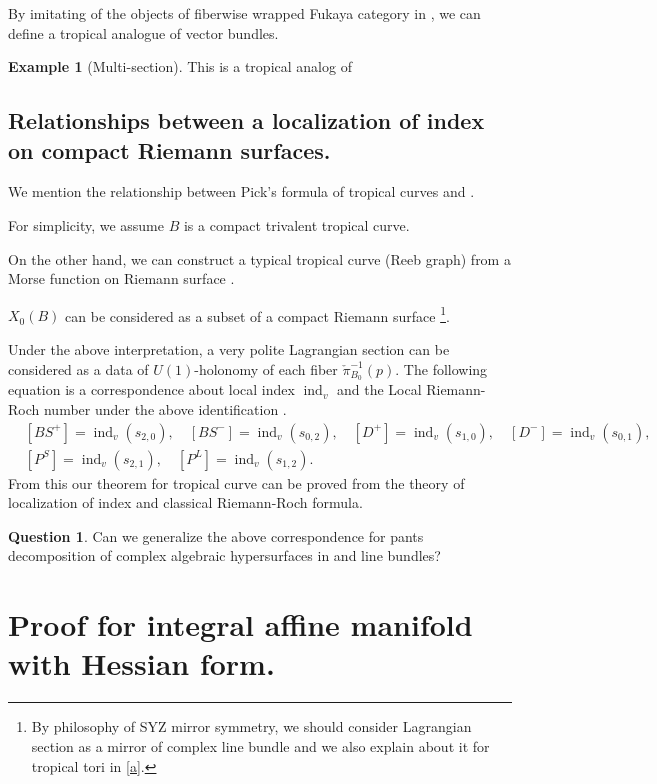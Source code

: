 \documentclass[a4paper,dvipdfmx,reqno,12pt]{amsart}
\theoremstyle{definition}
\newtheorem{Eg}[Thm]{Example}
\newtheorem{Ques}[Thm]{Question}
\newcommand{\opn}[1]{\operatorname{#1}}
\numberwithin{equation}{section}
\begin{document}
By imitating of the objects of fiberwise wrapped Fukaya category 
in \cite{auroux2022lagrangian}, we can define a tropical 
analogue of vector bundles.
\begin{Eg}[{Multi-section}]

This is a tropical analog of 
\end{Eg}

\subsection{Relationships between a localization of 
index on compact Riemann surfaces.}

We mention the relationship between Pick's formula of tropical curves and
\cite[6]{MR2676658}.

For simplicity, we assume $B$ is a compact trivalent tropical curve.

On the other hand, we can construct a typical tropical curve
(Reeb graph) from a Morse function on Riemann surface
\cite[3.2.2]{kontsevichAffineStructuresNonArchimedean2006a}.

$X_0(B)$  can be considered as a subset of a compact Riemann surface
\footnote{By philosophy of SYZ mirror symmetry,
  we should consider Lagrangian section as a mirror of complex line bundle
  and we also explain about it for tropical tori in \cref{a}.
}.

Under the above interpretation, a very polite Lagrangian section can be considered as a data of $U(1)$-holonomy of each fiber $\check{\pi}_{B_0}^{-1}(p)$.
The following equation is a correspondence about local index $\opn{ind}_v$ and the Local Riemann-Roch number under the above identification \cite[Theorem 6.7]{MR2676658}.
\begin{align}
   & [BS^{+}]=\opn{ind}_v(s_{2,0}),
  \quad [BS^{-}]=\opn{ind}_v(s_{0,2}),
  \quad [D^{+}]=\opn{ind}_v(s_{1,0}),
  \quad [D^{-}]=\opn{ind}_v(s_{0,1}), \\
   & [P^{S}]=\opn{ind}_v(s_{2,1}),
  \quad [P^{L}]=\opn{ind}_v(s_{1,2}).
\end{align}
From this our theorem for tropical curve can be proved from the theory of localization of index and classical Riemann-Roch formula.
\begin{Ques}
  Can we generalize the above correspondence for pants decomposition of
  complex algebraic hypersurfaces in \cite{MR2079993} and line bundles?
\end{Ques}

\section{Proof for integral affine manifold with Hessian form.}
\end{document}
